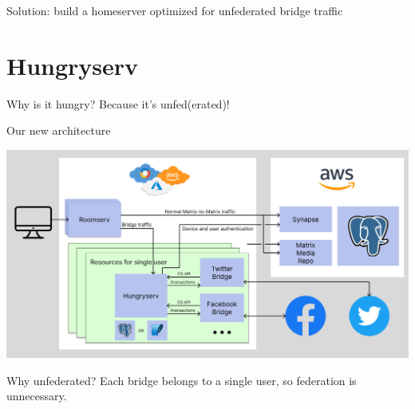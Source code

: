 \documentclass{beeper}
\begin{document}
\begin{frame}[standout]
    \Large
    Solution: build a homeserver optimized for unfederated bridge traffic
\end{frame}

\section{Hungryserv}

\begin{frame}{Why is it hungry?}
    \Large
    Because it's unfed(erated)!
\end{frame}

\begin{frame}{Our new architecture}
    \centerline{\includegraphics[width=1.15\textwidth]{images/new-architecture}}
\end{frame}

\begin{frame}{Why unfederated?}
    Each bridge belongs to a single user, so federation is unnecessary.
\end{frame}

\end{document}

